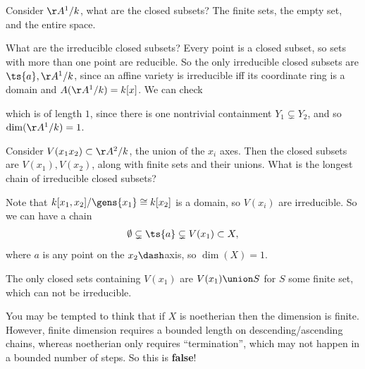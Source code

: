 \begin{example}

Consider \(\AA^1/k\), what are the closed subsets? The finite sets, the
empty set, and the entire space.

What are the irreducible closed subsets? Every point is a closed subset,
so sets with more than one point are reducible. So the only irreducible
closed subsets are \(\ts{a}, \AA^1/k\), since an affine variety is
irreducible iff its coordinate ring is a domain and
\(A(\AA^1/k) = k[x]\). We can check

\begin{center}
\end{center}

which is of length \(1\), since there is one nontrivial containment
\(Y_1 \subsetneq Y_2\), and so \(\dim(\AA^1/k) = 1\).

\end{example}

\begin{example}

Consider \(V(x_1 x_2) \subset \AA^2/k\), the union of the \(x_i\) axes.
Then the closed subsets are \(V(x_1), V(x_2)\), along with finite sets
and their unions. What is the longest chain of irreducible closed
subsets?

Note that \(k[x_1, x_2] / \gens{x_1} \cong k[x_2]\) is a domain, so
\(V(x_i)\) are irreducible. So we can have a chain
\begin{align*}  
\emptyset \subsetneq \ts{a} \subsetneq V(x_1) \subset X
,\end{align*} where \(a\) is any point on the \(x_2\dash\)axis, so
\(\dim(X) = 1\).

The only closed sets containing \(V(x_1)\) are \(V(x_1)\union S\) for
\(S\) some finite set, which can not be irreducible.

\end{example}

\begin{remark}

You may be tempted to think that if \(X\) is noetherian then the
dimension is finite. However, finite dimension requires a bounded length
on descending/ascending chains, whereas noetherian only requires
``termination'', which may not happen in a bounded number of steps. So
this is \textbf{false}!

\end{remark}

